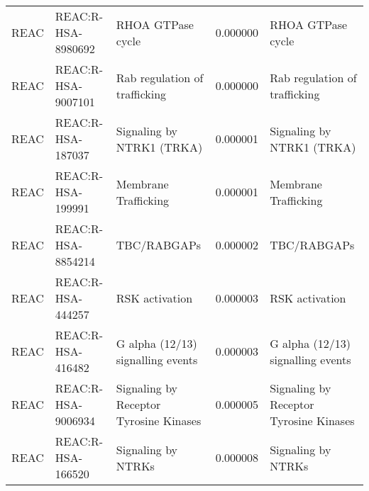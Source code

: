\begin{tabular}{lllrl}
REAC & REAC:R-HSA-8980692 & RHOA GTPase cycle & 0.000000 & RHOA GTPase cycle \\
REAC & REAC:R-HSA-9007101 & Rab regulation of trafficking & 0.000000 & Rab regulation of trafficking \\
REAC & REAC:R-HSA-187037 & Signaling by NTRK1 (TRKA) & 0.000001 & Signaling by NTRK1 (TRKA) \\
REAC & REAC:R-HSA-199991 & Membrane Trafficking & 0.000001 & Membrane Trafficking \\
REAC & REAC:R-HSA-8854214 & TBC/RABGAPs & 0.000002 & TBC/RABGAPs \\
REAC & REAC:R-HSA-444257 & RSK activation & 0.000003 & RSK activation \\
REAC & REAC:R-HSA-416482 & G alpha (12/13) signalling events & 0.000003 & G alpha (12/13) signalling events \\
REAC & REAC:R-HSA-9006934 & Signaling by Receptor Tyrosine Kinases & 0.000005 & Signaling by Receptor Tyrosine Kinases \\
REAC & REAC:R-HSA-166520 & Signaling by NTRKs & 0.000008 & Signaling by NTRKs \\
\bottomrule
\end{tabular}
